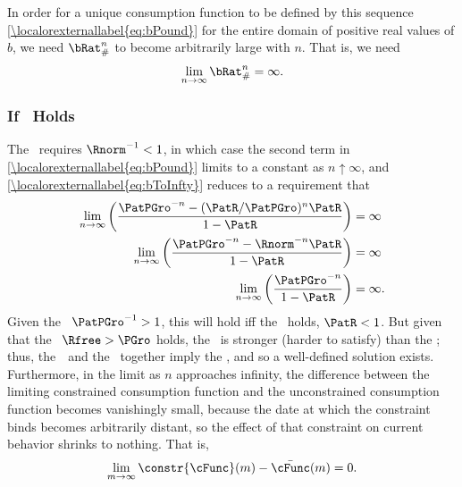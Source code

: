 \documentclass[\econtexRoot/BufferStockTheory]{subfiles}
\begin{document}
In order for a unique consumption function to be defined by this
sequence \eqref{\localorexternallabel{eq:bPound}} for the entire domain of positive real
values of $b$, we need $\bRat_{\#}^{n}$ to become arbitrarily large with
$n$.  That is, we need
\begin{equation}\begin{gathered}\begin{aligned}
  \lim_{n \rightarrow \infty} \bRat_{\#}^{n} = \infty. \label{eq:bToInfty}
\end{aligned}\end{gathered}\end{equation}

\subsubsection{If \FHWC~Holds}
The \FHWC~requires $\Rnorm^{-1} < 1$, in which case the second term in \eqref{\localorexternallabel{eq:bPound}} limits to a constant as $n \uparrow \infty$, and \eqref{\localorexternallabel{eq:bToInfty}} reduces to a requirement that
\begin{eqnarray*}
  \lim_{n \rightarrow \infty} \left(\frac{\PatPGro^{-n}-(\PatR/\PatPGro)^{n}\PatR}{1-\PatR}\right)  & = \infty
  \\  \lim_{n \rightarrow \infty} \left(\frac{\PatPGro^{-n}-\Rnorm^{-n}\PatR}{1-\PatR}\right)  & = \infty
  \\  \lim_{n \rightarrow \infty} \left(\frac{\PatPGro^{-n}}{1-\PatR}\right)  & = \infty.
\end{eqnarray*}
Given the \PFGIC~$\PatPGro^{-1}>1$, this will hold iff the \RIC~holds, $\PatR < 1$.  But given that the \FHWC~$\Rfree > \PGro$ holds, the \PFGIC~is stronger (harder to satisfy) than the \RIC; thus, the~\FHWC~and the \PFGIC~together imply the \RIC, and so a well-defined
solution exists.  Furthermore, in the limit as $n$ approaches
infinity, the difference between the limiting constrained consumption
function and the unconstrained consumption function becomes
vanishingly small, because the date at which the constraint binds
becomes arbitrarily distant, so the effect of that constraint on current
behavior shrinks to nothing.  That is,
\begin{equation}\begin{gathered}\begin{aligned}
  \lim_{m \rightarrow \infty}\constr{\cFunc}(m) - \bar{\cFunc}(m) = 0.
\end{aligned}\end{gathered}\end{equation}
\end{document}
